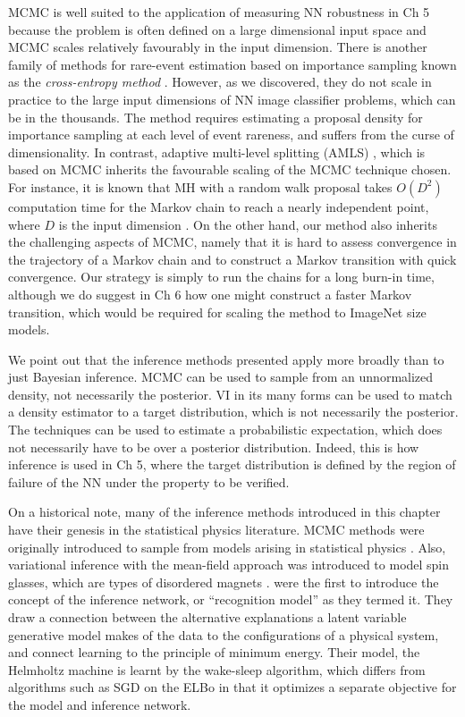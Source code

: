 MCMC is well suited to the application of measuring NN robustness in Ch 5 because the problem is often defined on a large dimensional input space and MCMC scales relatively favourably in the input dimension. There is another family of methods for rare-event estimation based on importance sampling known as the \emph{cross-entropy method} \citep{de2005tutorial}. However, as we discovered, they do not scale in practice to the large input dimensions of NN image classifier problems, which can be in the thousands. The method requires estimating a proposal density for importance sampling at each level of event rareness, and suffers from the curse of dimensionality. In contrast, adaptive multi-level splitting (AMLS) \citep{guyader2011simulation}, which is based on MCMC inherits the favourable scaling of the MCMC technique chosen. For instance, it is known that MH with a random walk proposal takes $O(D^2)$ computation time for the Markov chain to reach a nearly independent point, where $D$ is the input dimension \citep{Neal2011}. On the other hand, our method also inherits the challenging aspects of MCMC, namely that it is hard to assess convergence in the trajectory of a Markov chain and to construct a Markov transition with quick convergence. Our strategy is simply to run the chains for a long burn-in time, although we do suggest in Ch 6 how one might construct a faster Markov transition, which would be required for scaling the method to ImageNet size models.

We point out that the inference methods presented apply more broadly than to just Bayesian inference. MCMC can be used to sample from an unnormalized density, not necessarily the posterior. VI in its many forms can be used to match a density estimator to a target distribution, which is not necessarily the posterior. The techniques can be used to estimate a probabilistic expectation, which does not necessarily have to be over a posterior distribution. Indeed, this is how inference is used in Ch 5, where the target distribution is defined by the region of failure of the NN under the property to be verified.

On a historical note, many of the inference methods introduced in this chapter have their genesis in the statistical physics literature. MCMC methods were originally introduced to sample from models arising in statistical physics \citep{metropolis1953equation}. Also, variational inference with the mean-field approach was introduced to model spin glasses, which are types of disordered magnets \citep{opper2001advanced}. \citet{dayan1995helmholtz} were the first to introduce the concept of the inference network, or ``recognition model'' as they termed it. They draw a connection between the alternative explanations a latent variable generative model makes of the data to the configurations of a physical system, and connect learning to the principle of minimum energy. Their model, the Helmholtz machine is learnt by the wake-sleep algorithm, which differs from algorithms such as SGD on the ELBo in that it optimizes a separate objective for the model and inference network.